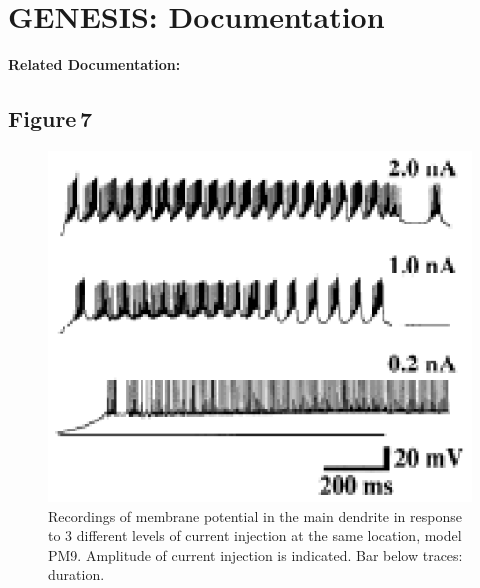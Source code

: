 \documentclass[12pt]{article}
\begin{document}
\section*{GENESIS: Documentation}

{\bf Related Documentation:}

\subsection*{Figure\,7}

\begin{figure}[h]
\centering
   \includegraphics[scale=1.5]{figures/Fig.1.7.eps}
   \caption{Recordings of membrane potential in the main dendrite in response
to 3 different levels of current injection at the same location, model
PM9. Amplitude of current injection is indicated. Bar below traces: duration.}
   \label{fig:DS1.7}
\end{figure}



\end{document}
